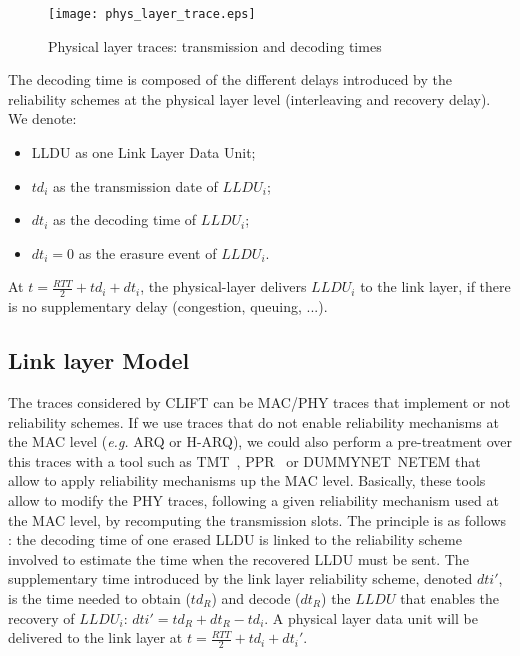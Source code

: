 \documentclass[conference,letterpaper]{IEEEtran}
\begin{document}
\begin{figure}[!ht]
    \begin{center}
	\texttt{[image: phys\_layer\_trace.eps]}
	\caption{Physical layer traces: transmission and decoding times}
	\label{fig::phys_trace_layer}
    \end{center}
\end{figure}

The decoding time is composed of the different delays introduced by the reliability schemes at the physical layer level (interleaving and recovery delay). We denote: 
\begin{itemize}
\item LLDU as one Link Layer Data Unit;
\item $td_i$ as the transmission date of $LLDU_i$;
\item $dt_i$ as the decoding time of $LLDU_i$;
\item $dt_i=0$ as the erasure event of $LLDU_i$.
\end{itemize} 
At $t=\frac{RTT}{2}+td_i+dt_i$, the physical-layer delivers $LLDU_i$ to the link layer, if there is no supplementary delay (congestion, queuing, ...). 

\subsection{Link layer Model}
\label{subsec::link_layer_schemes}

The traces considered by CLIFT can be MAC/PHY traces that implement or not reliability schemes. If we use traces that do not enable reliability mechanisms at the MAC level (\textit{e.g.} ARQ or H-ARQ), we could also perform a pre-treatment over this traces with a tool such as TMT~\cite{link_soft_tmt}, PPR~\cite{link_soft_ppr} or DUMMYNET~NETEM\cite{link_soft_dummynet} that allow to apply reliability mechanisms up the MAC level. Basically, these tools allow to modify the PHY traces, following a given reliability mechanism used at the MAC level, by recomputing the transmission slots.
The principle is as follows : the decoding time of one erased LLDU is linked to the reliability scheme involved to estimate the time when the recovered LLDU must be sent. The supplementary time introduced by the link layer reliability scheme, denoted $dti'$, is the time needed to obtain ($td_R$) and decode ($dt_R$) the $LLDU$ that enables the recovery of $LLDU_i$: $dti'=td_R+dt_R-td_i$. A physical layer data unit will be delivered to the link layer at $t=\frac{RTT}{2}+td_i+dt_i'$.
 
\end{document}
